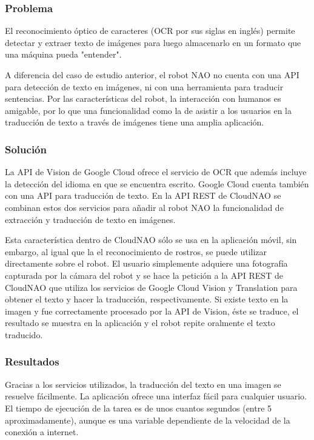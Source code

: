 \subsubsection{Problema}

El reconocimiento óptico de caracteres (OCR por sus siglas en inglés) permite detectar y extraer texto de imágenes para luego
almacenarlo en un formato que una máquina pueda "entender".

A diferencia del caso de estudio anterior, el robot NAO
no cuenta con una API para detección de
texto en imágenes, ni con una herramienta
para traducir sentencias. Por las características
del robot, la interacción con humanos es 
amigable, por lo que una funcionalidad como la de asistir
a los usuarios en la traducción de texto a través
de imágenes tiene una amplia aplicación.

\subsubsection{Solución}


La API de Vision de Google Cloud ofrece el servicio de OCR
que además incluye la detección del idioma en que se encuentra escrito.
Google Cloud cuenta también con una API para traducción de 
texto.
En la API REST de CloudNAO se combinan estos dos servicios
para añadir al robot NAO la funcionalidad de extracción y traducción de texto en imágenes. 

Esta característica dentro de CloudNAO sólo
se usa en la aplicación móvil, sin embargo, al igual que
la el reconocimiento de rostros, se puede utilizar directamente
sobre el robot. El usuario simplemente adquiere una fotografía
capturada por la cámara del robot y se hace la petición
a la API REST de CloudNAO que utiliza los servicios
de Google Cloud Vision y Translation para obtener el texto
y hacer la traducción, respectivamente.
Si existe texto en la imagen y fue correctamente procesado por
la API de Vision, éste se traduce, el resultado se muestra
en la aplicación y el robot repite oralmente
el texto traducido.

\subsubsection{Resultados}

Gracias a los servicios utilizados, la traducción 
del texto en una imagen se resuelve fácilmente.
La aplicación ofrece una interfaz fácil para cualquier
usuario. El tiempo de ejecución de la tarea
es de unos cuantos segundos (entre 5 aproximadamente), aunque es 
una variable dependiente de la velocidad de la conexión 
a internet.


